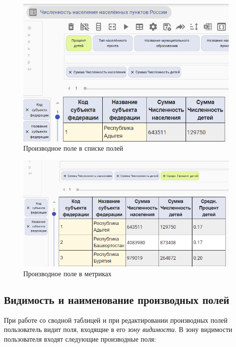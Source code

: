 \documentclass[../user-manual.tex]{subfiles}
\begin{document}
	\begin{figure}[h]
		\centering
		\includegraphics[width=\graphicswidth]{img/9-deriver-field.png}
		\caption{Производное поле в списке полей}
		\label{fig:derived-field-2}
	\end{figure}

	\begin{figure}[h]
		\centering
		\includegraphics[width=\graphicswidth]{img/10-deriver-field.png}
		\caption{Производное поле в метриках}
		\label{fig:derived-field-3}
	\end{figure}
	
	\subsection{Видимость и наименование производных полей}\label{subsection:deriver-field-name}
	
	При работе со сводной таблицей и при редактировании производных полей пользователь видит поля, входящие в его \textit{зону видимости}. В зону видимости пользователя входят следующие производные поля:
	
\end{document}
